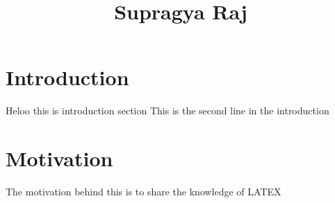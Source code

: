 \documentclass[12pt,a4paper]{article}
\begin{document}
\title{Supragya Raj}
\maketitle

\section{Introduction}
Heloo this is introduction section
This is the second line in the introduction

\section{Motivation}
The motivation behind this is to share the knowledge of LATEX
\end{document}
